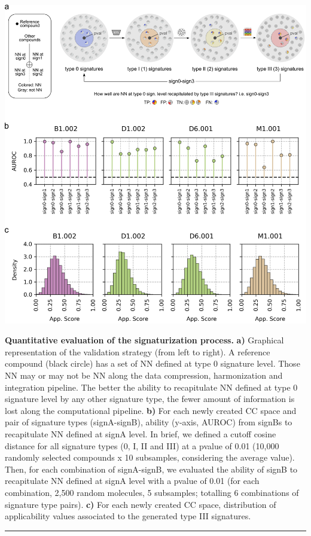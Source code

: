 \begin{Figure_modified}
  \centering
  \includegraphics[width=\linewidth]{figures/Protocols/Main/Fig3.eps}
  \vspace{-10mm}
  \caption{
    \textbf{Quantitative evaluation of the signaturization process.} 
    \textbf{a)} Graphical representation of the validation strategy (from left to right). A reference compound (black circle) has a set of NN defined at type 0 signature level. Those NN may or may not be NN along the data compression, harmonization and integration pipeline. The better the ability to recapitulate NN defined at type 0 signature level by any other signature type, the fewer amount of information is lost along the computational pipeline. 
    \textbf{b)} For each newly created CC space and pair of signature types (signA-signB), ability (y-axis, AUROC) from signBs to recapitulate NN defined at signA level. In brief, we defined a cutoff cosine distance for all signature types (0, I, II and III) at a pvalue of 0.01 (10,000 randomly selected compounds x 10 subsamples, considering the average value). Then, for each combination of signA-signB, we evaluated the ability of signB to recapitulate NN defined at signA level with a pvalue of 0.01 (for each combination, 2,500 random molecules, 5 subsamples; totalling 6 combinations of signature type pairs). 
    \textbf{c)} For each newly created CC space, distribution of applicability values associated to the generated type III signatures.
  }
  \vspace{-5mm}
  \rule[0ex]{\textwidth}{0.5pt}
  \vspace{-9mm}
  \label{Protocols_Fig3}
\end{Figure_modified}

